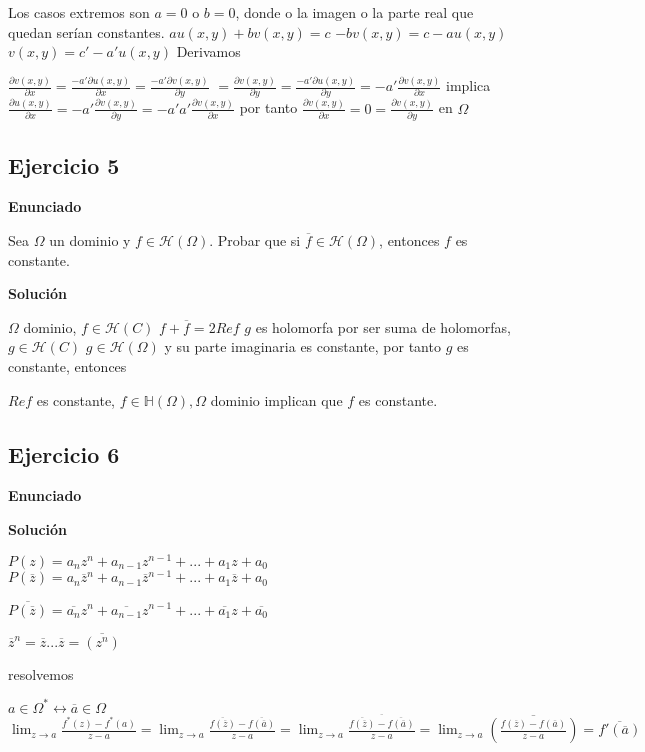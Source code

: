 Los casos extremos son $a=0$ o $b=0$, donde o la imagen o la parte real que quedan serían constantes.
$au(x,y)+bv(x,y)=c$
$-bv(x,y) = c-au(x,y)$
$v(x,y)= c'-a'u(x,y)$
Derivamos

$\frac{\partial v(x,y)}{\partial x} = \frac{-a' \partial u(x,y)}{\partial x} = \frac{-a' \partial v(x,y)}{\partial y}$
$= \frac{\partial v(x,y)}{\partial y} = \frac{-a' \partial u(x,y)}{\partial y} = -a' \frac{\partial v(x,y)}{\partial x}$
implica
$\frac{\partial u (x,y)}{\partial x} = -a'\frac{\partial v(x,y)}{\partial y} = -a'a'\frac{\partial v(x,y)}{\partial x}$
por tanto
$\frac{\partial v(x,y)}{\partial x} = 0 = \frac{\partial v(x,y)}{\partial y}$ en $\Omega$


\subsection{Ejercicio 5}
\textbf{Enunciado}

Sea $\Omega$ un dominio y $f\in\mathcal{H}(\Omega)$. Probar que si $\overline{f}\in\mathcal{H}(\Omega)$, entonces $f$ es constante.

\textbf{Solución}

$\Omega$ dominio, $f\in\mathcal{H}(C)$
$f+\overline{f} = 2Re f$
$g$ es holomorfa por ser suma de holomorfas, $g\in\mathcal{H}(C)$
$g\in\mathcal{H}(\Omega)$ y su parte imaginaria es constante, por tanto $g$ es constante, entonces

$Re f$ es constante, $f\in\mathbb{H}(\Omega), \Omega$ dominio implican que $f$ es constante.


\subsection{Ejercicio 6}
\textbf{Enunciado}





\textbf{Solución}

$P(z) = a_n z^n + a_{n-1}z^{n-1}+...+a_1z + a_0$
$P(\overline{z}) = a_n \overline{z}^n + a_{n-1}\overline{z}^{n-1}+...+a_1\overline{z} + a_0 $

$\overline{ P(\overline{z}) } = \overline{a_n}z^n + \overline{a_{n-1}}z^{n-1}+...+\overline{a_1}z + \overline{a_0}$

$\overline{z}^n  = \overline{z} ... \overline{z} = \overline{(z^n)}$


resolvemos

$a\in\Omega^{\ast} \longleftrightarrow \overline{a}\in\Omega$
$\lim_{z\rightarrow a} \frac{f^{\ast}(z)-f^{\ast}(a)}{z-a} = \lim_{z\rightarrow a} \frac{\overline{f(\overline{z})} - \overline{f(\overline{a})}}{z-a} =
 \lim_{z\rightarrow a} \frac{\overline{\overline{f(\overline{z})} - \overline{f(\overline{a})}}}{z-a} =
 \lim_{z\rightarrow a} \overline{\left( \frac{f(\overline{z})-f(\overline{a})}{z-a} \right)} =
 \overline{f'(\overline{a})}$



